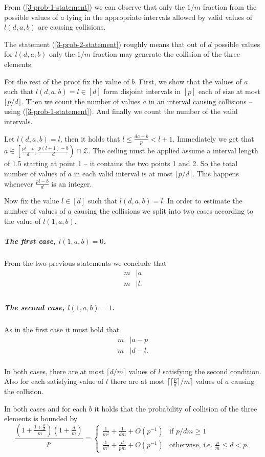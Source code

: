 \documentclass{article}
\begin{document}
From (\ref{3-prob-1-statement}) we can observe that only the $1 / m$ fraction from the possible values of $a$ lying in the appropriate intervals allowed by valid values of $l(d, a, b)$ are causing collisions.

The statement (\ref{3-prob-2-statement}) roughly means that out of $d$ possible values for $l(d, a, b)$ only the $1 / m$ fraction may generate the collision of the three elements.

For the rest of the proof fix the value of $b$. 
First, we show that the values of $a$ such that $l(d, a, b) = l \in [d]$ form disjoint intervals in $[p]$ each of size at most $\lceil p/d \rceil$.
Then we count the number of values $a$ in an interval causing collisions -- using (\ref{3-prob-1-statement}).
And finally we count the number of the valid intervals.

Let $l(d, a, b) = l$, then it holds that $l \leq \frac{da + b}{p} < l + 1$. Immediately we get that $a \in \left[\frac{pl - b}{d}, \frac{p(l + 1) - b}{d}\right) \cap \mathcal{Z}$. The ceiling must be applied assume a interval length of 1.5 starting at point 1 -- it contains the two points 1 and 2. So the total number of values of $a$ in each valid interval is at most $\lceil p / d \rceil$. This happens whenever $\frac{pl - b}{d}$ is an integer.

Now fix the value $l \in [d]$ such that $l(d, a, b) = l$.
In order to estimate the number of values of $a$ causing the collisions we split into two cases according to the value of $l(1, a, b)$.

\subparagraph{The first case, $l(1, a, b) = 0$.} 
From the two previous statements we conclude that
\begin{align*}
	m & \mid a \\
	m & \mid l. \\
\end{align*}

\subparagraph{The second case, $l(1, a, b) = 1$.}
As in the first case it must hold that
\begin{align*}
	m & \mid a - p \\
	m & \mid d - l. \\
\end{align*}

In both cases, there are at most $\lceil d/m \rceil$ values of $l$ satisfying the second condition.
Also for each satisfying value of $l$ there are at most $\lceil \lceil\frac{p}{d}\rceil / m \rceil$ values of $a$ causing the collision.

In both cases and for each $b$ it holds that the probability of collision of the three elements is bounded by
\[
\frac{\left(1 + \frac{1 + \frac{p}{d}}{m}\right)\left(1 + \frac{d}{m}\right)}{p} =
\begin{cases}
	\frac{1}{m^2} + \frac{1}{dm} + O\left(p^{-1}\right) & \mbox{if } p/dm \geq 1 \\
	\frac{1}{m^2} + \frac{d}{pm} + O\left(p^{-1}\right) & \mbox{otherwise, i.e. } \frac{p}{m} \leq d < p.
\end{cases}
\]
\end{document}
